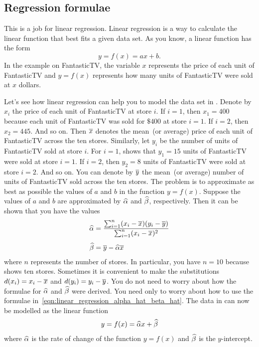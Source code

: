 \documentclass[a4paper,oneside,12pt]{article}
\begin{document}

\subsection*{Regression formulae}

This is a job for linear regression.  Linear regression is a way to
calculate the linear function that best fits a given data set.  As you
know, a linear function has the form
\[
y
=
f(x)
=
ax + b.
\]
In the example on FantasticTV, the variable $x$ represents the price
of each unit of FantasticTV and $y = f(x)$ represents how many units
of FantasticTV were sold at $x$ dollars.

Let's see how linear regression can help you to model the data set in
.  Denote by $x_i$ the price of each unit of
FantasticTV at store $i$.  If $i = 1$, then $x_1 = 400$ because each
unit of FantasticTV was sold for $\$400$ at store $i = 1$.  If
$i = 2$, then $x_2 = 445$.  And so on.  Then $\overline{x}$ denotes the
mean~(or average) price of each unit of FantasticTV across the ten
stores.  Similarly, let $y_i$ be the number of units of FantasticTV
sold at store $i$.  For $i = 1$,  shows that $y_1 =
15$ units of FantasticTV were sold at store $i = 1$.  If $i = 2$, then
$y_2 = 8$ units of FantasticTV were sold at store $i = 2$.  And so
on.  You can denote by $\overline{y}$ the mean~(or average) number of units
of FantasticTV sold across the ten stores.  The problem is to
approximate as best as possible the values of $a$ and $b$ in the
function $y = f(x)$.  Suppose the values of $a$ and $b$ are
approximated by $\widehat{\alpha}$ and $\widehat{\beta}$, respectively.  Then it can
be shown that you have the values
\begin{equation}
\label{eqn:linear_regression_alpha_hat_beta_hat}
\begin{aligned}
\widehat{\alpha}
&=
\frac{
  \sum_{i=1}^n (x_i - \overline{x}) (y_i - \overline{y})
}{
  \sum_{i=1}^n (x_i - \overline{x})^2
} \\[4pt]
\widehat{\beta}
&=
\overline{y} - \widehat{\alpha} \overline{x}
\end{aligned}
\end{equation}
where $n$ represents the number of stores.  In particular, you have
$n = 10$ because  shows ten stores.  Sometimes it
is convenient to make the substitutions $d(x_i) = x_i - \overline{x}$ and
$d(y_i) = y_i - \overline{y}$.  You do not need to worry about how the
formulae for $\widehat{\alpha}$ and $\widehat{\beta}$ were derived. You need only to
worry about how to use the formulae
in~\eqref{eqn:linear_regression_alpha_hat_beta_hat}.  The data in
 can now be modelled as the linear function
\[
y
=
f(x)
=
\widehat{\alpha} x + \widehat{\beta}
\]
where $\widehat{\alpha}$ is the rate of change of the function $y = f(x)$ and
$\widehat{\beta}$ is the $y$-intercept.
\end{document}
